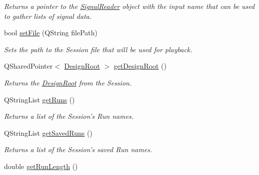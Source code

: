 \begin{DoxyCompactItemize}
\begin{DoxyCompactList}\small\item\em Returns a pointer to the \hyperlink{class_picto_1_1_signal_reader}{Signal\-Reader} object with the input name that can be used to gather lists of signal data. \end{DoxyCompactList}\item 
bool \hyperlink{class_picto_1_1_playback_state_updater_adc11cc6489dd7d46067c2e58bebb167a}{set\-File} (Q\-String file\-Path)
\begin{DoxyCompactList}\small\item\em Sets the path to the Session file that will be used for playback. \end{DoxyCompactList}\item 
\hypertarget{class_picto_1_1_playback_state_updater_aa8be47e35dc34a6cfff8d9983f97dbb2}{Q\-Shared\-Pointer$<$ \hyperlink{class_picto_1_1_design_root}{Design\-Root} $>$ \hyperlink{class_picto_1_1_playback_state_updater_aa8be47e35dc34a6cfff8d9983f97dbb2}{get\-Design\-Root} ()}\label{class_picto_1_1_playback_state_updater_aa8be47e35dc34a6cfff8d9983f97dbb2}

\begin{DoxyCompactList}\small\item\em Returns the \hyperlink{class_picto_1_1_design_root}{Design\-Root} from the Session. \end{DoxyCompactList}\item 
\hypertarget{class_picto_1_1_playback_state_updater_a329686ce976d61400b5d25dbd60bd513}{Q\-String\-List \hyperlink{class_picto_1_1_playback_state_updater_a329686ce976d61400b5d25dbd60bd513}{get\-Runs} ()}\label{class_picto_1_1_playback_state_updater_a329686ce976d61400b5d25dbd60bd513}

\begin{DoxyCompactList}\small\item\em Returns a list of the Session's Run names. \end{DoxyCompactList}\item 
\hypertarget{class_picto_1_1_playback_state_updater_aec7b221c02bf51e516f8d845353d8f9c}{Q\-String\-List \hyperlink{class_picto_1_1_playback_state_updater_aec7b221c02bf51e516f8d845353d8f9c}{get\-Saved\-Runs} ()}\label{class_picto_1_1_playback_state_updater_aec7b221c02bf51e516f8d845353d8f9c}

\begin{DoxyCompactList}\small\item\em Returns a list of the Session's saved Run names. \end{DoxyCompactList}\item 
\hypertarget{class_picto_1_1_playback_state_updater_a28c21bd5c3efdaac2f8ee00f4ff7be18}{double \hyperlink{class_picto_1_1_playback_state_updater_a28c21bd5c3efdaac2f8ee00f4ff7be18}{get\-Run\-Length} ()}\label{class_picto_1_1_playback_state_updater_a28c21bd5c3efdaac2f8ee00f4ff7be18}


\end{DoxyCompactItemize}
